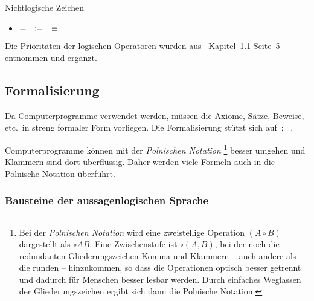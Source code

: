 \documentclass[english,ngerman,parskip=half,headsepline,footsepline]{scrreprt}
\makeatletter
\newcommand*{\textetc}{etc.\@}
\makeatother
\begin{document}
	Nichtlogische Zeichen
	\begin{itemize}
		\item $=\quad\coloneqq\quad\equiv$
	\end{itemize}

	Die Prioritäten der logischen Operatoren wurden aus~\cite{bib:Rautenberg} Kapitel~1.1 Seite~5 entnommen und ergänzt.

	\subsection{Formalisierung}%
	\label{sub:Formalisierung}

	Da Computerprogramme verwendet werden, müssen die Axiome, Sätze, Beweise, \textetc\ in streng formaler Form vorliegen.
	Die Formalisierung stützt sich auf~\cite{bib:Aussagenlogik}; \alsoname~\cite{bib:LogikDe, bib:LogikEn}.

	Computerprogramme können mit der \emph{Polnischen Notation}%
	\footnote{%
		Bei der \emph{Polnischen Notation} wird eine zweistellige Operation $(A\circ B)$ dargestellt als $\circ A B$.
		Eine Zwischenstufe ist $\circ(A,B)$, bei der noch die redundanten Gliederungszeichen Komma und Klammern -- auch andere als die runden -- hinzukommen, so dass die Operationen optisch besser getrennt und dadurch für Menschen besser lesbar werden.
		Durch einfaches Weglassen der Gliederungszeichen ergibt sich dann die Polnische Notation.
	}
	besser umgehen und Klammern sind dort überflüssig.
	Daher werden viele Formeln auch in die Polnische Notation überführt.

	\subsubsection{Bausteine der aussagenlogischen Sprache}
	\label{subsub:Bausteine}

	\newcommand*{\ItemB}[2]{\item[]\makebox[0.7cm][l]{#1}\makebox[4.0cm][l]{#2}}
	\newcommand*{\ItemF}[2]{\item[]\makebox[2.0cm][l]{#1}\makebox[4.5cm][l]{#2}}

	\newcommand*{\ase}{_\mathrm{e}}
	\newcommand*{\asp}{^\mathrm{p}}
	\newcommand*{\aspe}{^\mathrm{p}_\mathrm{e}}

	\newcommand*{\asN}{\mathbb{N}_0}
	\newcommand*{\asA}{\mathcal{A}}
	\newcommand*{\asB}{\mathcal{B}}
	\newcommand*{\asC}{\mathcal{C}}
	\newcommand*{\asF}{\mathcal{F}}
	\newcommand*{\asJ}{\mathcal{J}}
	\newcommand*{\asS}{\mathcal{S}}
	\newcommand*{\asU}{\mathcal{U}}
	\newcommand*{\asV}{\mathcal{V}}
	\newcommand*{\asX}{\mathcal{X}}
	\newcommand*{\asAe}{\asA\ase}
	\newcommand*{\asBe}{\asB\ase}
	\newcommand*{\asXe}{\asX\ase}
	\newcommand*{\asFe}{\asF\ase}
	\newcommand*{\asFp}{\asF\asp}
	\newcommand*{\asFpe}{\asF\aspe}
\end{document}

